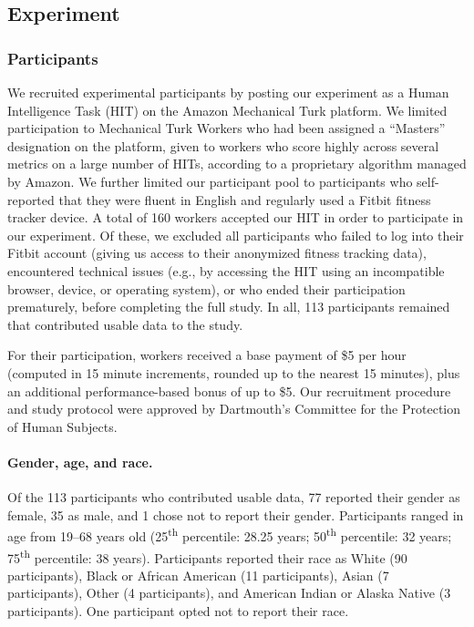 \documentclass[10pt]{article}
\begin{document}
    
    
\subsection*{Experiment}
\subsubsection*{Participants}
We recruited experimental participants by posting our experiment as a
Human Intelligence Task (HIT) on the Amazon Mechanical Turk platform.
We limited participation to Mechanical Turk Workers who had been
assigned a ``Masters'' designation on the platform, given to workers
who score highly across several metrics on a large number of HITs,
according to a proprietary algorithm managed by Amazon.  We further
limited our participant pool to participants who self-reported that
they were fluent in English and regularly used a Fitbit fitness
tracker device.  A total of 160 workers accepted our
HIT in order to participate in our experiment.  Of these, we excluded all
participants who failed to log into their Fitbit account (giving us
access to their anonymized fitness tracking data), encountered
technical issues (e.g., by accessing the HIT using an incompatible browser, device, or
operating system), or who ended their participation prematurely,
before completing the full study.  In all, 113 participants remained
that contributed usable data to the study.

For their participation, workers received a base payment of \$5 per hour (computed in 15
minute increments, rounded up to the nearest 15 minutes), plus an
additional performance-based bonus of up to \$5.  Our recruitment
procedure and study protocol
were approved by Dartmouth's Committee for the Protection of Human Subjects.

\paragraph{Gender, age, and race.}
Of the 113 participants who contributed usable data, 77 reported their gender as female, 35 as
male, and 1 chose not to report their gender.  Participants ranged in
age from 19--68 years old (25\textsuperscript{th} percentile: 28.25
years; 50\textsuperscript{th} percentile: 32 years;
75\textsuperscript{th} percentile: 38 years).  Participants reported
their race as White (90 participants), Black or African American (11
participants), Asian (7 participants), Other (4 participants), and
American Indian or Alaska Native (3 participants).  One participant
opted not to report their race.
\end{document}

